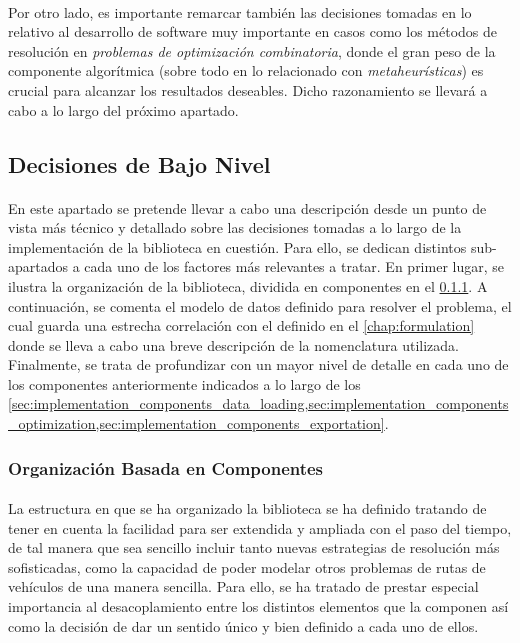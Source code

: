 \documentclass{subfiles}
\begin{document}
        \paragraph{}
        Por otro lado, es importante remarcar también las decisiones tomadas en lo relativo al desarrollo de software muy importante en casos como los métodos de resolución en \emph{problemas de optimización combinatoria}, donde el gran peso de la componente algorítmica (sobre todo en lo relacionado con \emph{metaheurísticas}) es crucial para alcanzar los resultados deseables. Dicho razonamiento se llevará a cabo a lo largo del próximo apartado.
      
      \subsection{Decisiones de Bajo Nivel}
      \label{sec:implementation_low_level}

        \paragraph{}
        En este apartado se pretende llevar a cabo una descripción desde un punto de vista más técnico y detallado sobre las decisiones tomadas a lo largo de la implementación de la biblioteca en cuestión. Para ello, se dedican distintos sub-apartados a cada uno de los factores más relevantes a tratar. En primer lugar, se ilustra la organización de la biblioteca, dividida en componentes en el \cref{sec:implementation_components}. A continuación, se comenta el modelo de datos definido para resolver el problema, el cual guarda una estrecha correlación con el definido en el \cref{chap:formulation} donde se lleva a cabo una breve descripción de la nomenclatura utilizada. Finalmente, se trata de profundizar con un mayor nivel de detalle en cada uno de los componentes anteriormente indicados a lo largo de los \cref{sec:implementation_components_data_loading,sec:implementation_components_optimization,sec:implementation_components_exportation}.

        \subsubsection{Organización Basada en Componentes}
        \label{sec:implementation_components}

          \paragraph{}
          La estructura en que se ha organizado la biblioteca se ha definido tratando de tener en cuenta la facilidad para ser extendida y ampliada con el paso del tiempo, de tal manera que sea sencillo incluir tanto nuevas estrategias de resolución más sofisticadas, como la capacidad de poder modelar otros problemas de rutas de vehículos de una manera sencilla. Para ello, se ha tratado de prestar especial importancia al desacoplamiento entre los distintos elementos que la componen así como la decisión de dar un sentido único y bien definido a cada uno de ellos. 
\end{document}
